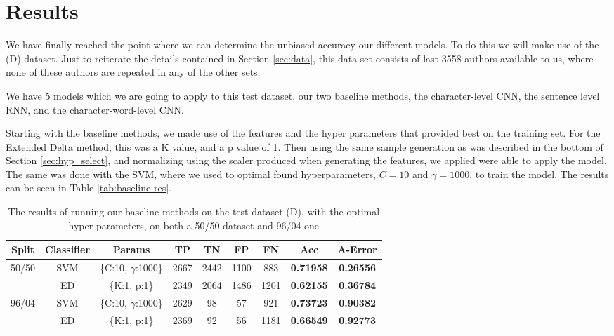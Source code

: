 \section{Results} \label{sec:results}

We have finally reached the point where we can determine the unbiased accuracy
our different models. To do this we will make use of the (D) dataset. Just
to reiterate the details contained in Section \ref{sec:data}, this data set
consists of last 3558 authors available to us, where none of these authors are
repeated in any of the other sets.

We have 5 models which we are going to apply to this test dataset,
our two baseline methods, the character-level \gls{CNN}, the sentence
level RNN, and the character-word-level \gls{CNN}.

Starting with the baseline methods, we made use of the features and the
hyper parameters that provided best on the training set.
For the Extended Delta method, this was a K value, and a p value of 1.
Then using the same sample generation as was described in the bottom
of Section \ref{sec:hyp_select}, and normalizing using the scaler
produced when generating the features, we applied were able to apply the model.
The same was done with the SVM, where we used to optimal found hyperparameters,
$C=10$ and $\gamma = 1000$, to train the model. The results can be seen in Table
\ref{tab:baseline-res}.

\begin{table}[h]
\centering
\begin{tabular}{|c|c|c|c|c|c|c||c|c|}
\hline
Split & Classifier & Params & TP & TN & FP & FN & \textbf{Acc} & \textbf{A-Error} \\ \hline
\multirow{2}{*}{50/50} & SVM & \{C:10, $\gamma$:1000\} & 2667 & 2442 & 1100 & 883 & \textbf{0.71958} & \textbf{0.26556} \\ \cline{2-9} 
 & ED & \{K:1, p:1\} & 2349 & 2064 & 1486 & 1201 & \textbf{0.62155} & \textbf{0.36784} \\ \hline
\multirow{2}{*}{96/04} & SVM & \{C:10, $\gamma$:1000\} & 2629 & 98 & 57 & 921 & \textbf{0.73723} & \textbf{0.90382} \\ \cline{2-9} 
 & ED & \{K:1, p:1\} & 2369 & 92 & 56 & 1181 & \textbf{0.66549} & \textbf{0.92773} \\ \hline
\end{tabular}
\caption{The results of running our baseline methods on the test dataset (D), with the optimal hyper
parameters, on both a 50/50 dataset and 96/04 one}
\label{tag:baseline-res}
\end{table}

